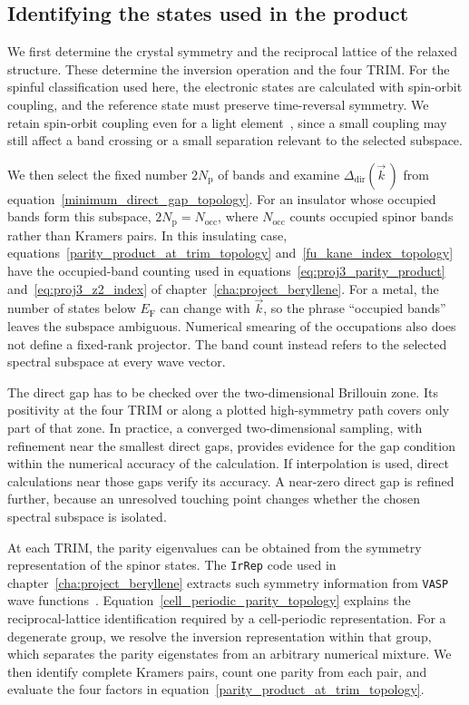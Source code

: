 \subsection{Identifying the states used in the product}

We first determine the crystal symmetry and the reciprocal lattice of the relaxed structure.
These determine the inversion operation and the four TRIM.
For the spinful classification used here, the electronic states are calculated with spin-orbit coupling,
and the reference state must preserve time-reversal symmetry.
We retain spin-orbit coupling even for a light element~\cite{molle2017buckled},
since a small coupling may still affect a band crossing or a small separation relevant to the selected subspace.

We then select the fixed number $2N_\mathrm{p}$ of bands and examine
$\Delta_\mathrm{dir}(\vec{k}\,)$ from equation~\eqref{minimum_direct_gap_topology}.
For an insulator whose occupied bands form this subspace, $2N_\mathrm{p}=N_\mathrm{occ}$,
where $N_\mathrm{occ}$ counts occupied spinor bands rather than Kramers pairs.
In this insulating case, equations~\eqref{parity_product_at_trim_topology} and~\eqref{fu_kane_index_topology}
have the occupied-band counting used in equations~\eqref{eq:proj3_parity_product} and~\eqref{eq:proj3_z2_index} of chapter~\ref{cha:project_beryllene}.
For a metal, the number of states below $E_\mathrm{F}$ can change with $\vec{k}$,
so the phrase ``occupied bands'' leaves the subspace ambiguous.
Numerical smearing of the occupations also does not define a fixed-rank projector.
The band count instead refers to the selected spectral subspace at every wave vector.

The direct gap has to be checked over the two-dimensional Brillouin zone.
Its positivity at the four TRIM or along a plotted high-symmetry path covers only part of that zone.
In practice, a converged two-dimensional sampling, with refinement near the smallest direct gaps,
provides evidence for the gap condition within the numerical accuracy of the calculation.
If interpolation is used, direct calculations near those gaps verify its accuracy.
A near-zero direct gap is refined further, because an unresolved touching point changes whether the chosen spectral subspace is isolated.

At each TRIM, the parity eigenvalues can be obtained from the symmetry representation of the spinor states.
The \texttt{IrRep} code used in chapter~\ref{cha:project_beryllene}
extracts such symmetry information from \texttt{VASP} wave functions~\cite{iraola2022irrep}.
Equation~\eqref{cell_periodic_parity_topology} explains the reciprocal-lattice identification required by a cell-periodic representation.
For a degenerate group, we resolve the inversion representation within that group,
which separates the parity eigenstates from an arbitrary numerical mixture.
We then identify complete Kramers pairs, count one parity from each pair,
and evaluate the four factors in equation~\eqref{parity_product_at_trim_topology}.

